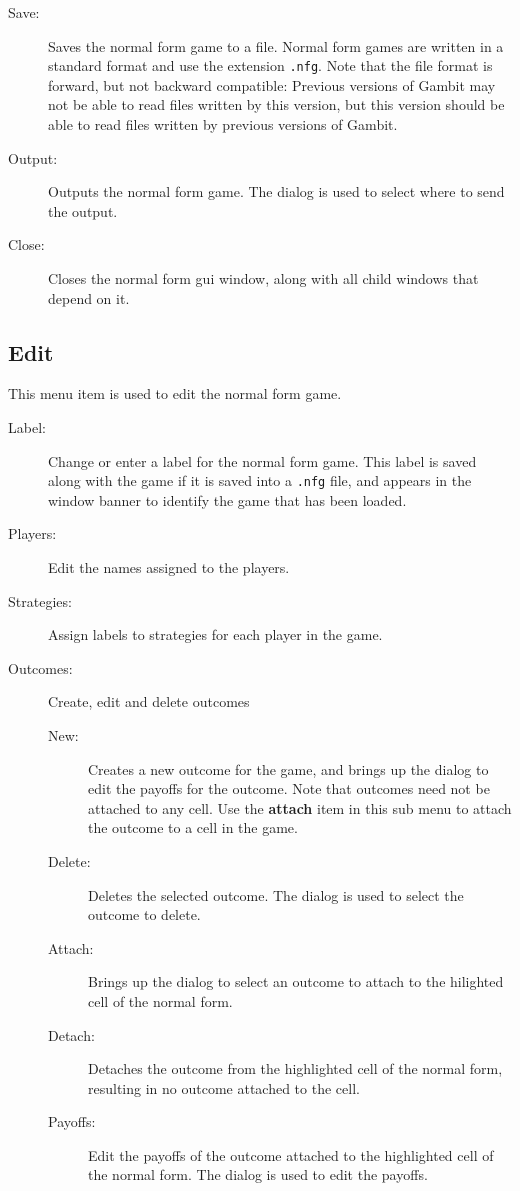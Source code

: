 \begin{description}
\item[Save:] Saves the normal form game to a file.  Normal form games
are written in a standard format and use the extension {\tt .nfg}.
Note that the file format is forward, but not backward compatible:
Previous versions of Gambit may not be able to read files written by
this version, but this version should be able to read files written by
previous versions of Gambit.
\item[Output:] Outputs the normal form game.  The  dialog is used to select where to send the output. 
\item[Close:] Closes the normal form gui window, along with all child windows that depend on it.  
\end{description}

\subsection{Edit}\label{nfedit}

This menu item is used to edit the normal form game.  

\begin{description}
\item[Label:] Change or enter a label for the normal form game. This
label is saved along with the game if it is saved into a {\tt .nfg}
file, and appears in the window banner to identify the game that has
been loaded.
\item[Players:] Edit the names assigned to the players. 
\item[Strategies:] Assign labels to strategies for each player in the game.   
\item[Outcomes:] Create, edit and delete outcomes
\begin{description}
\item[New:] Creates a new outcome for the game, and brings up the 
 dialog to edit the payoffs for
the outcome.  Note that outcomes need not be attached to any cell.
Use the {\bf attach} item in this sub menu to attach the outcome to a
cell in the game. 
\item[Delete:] Deletes the selected outcome.  The  dialog is used to select the outcome to
delete.
\item[Attach:] Brings up the  
dialog to select an outcome to attach to the hilighted cell of the
normal form.
\item[Detach:] Detaches the outcome from the highlighted cell of the
normal form, resulting in no outcome attached to the cell. 
\item[Payoffs:] Edit the payoffs of the outcome attached to the
highlighted cell of the normal form. The  dialog is used to edit the payoffs.
\end{description}
\end{description}


